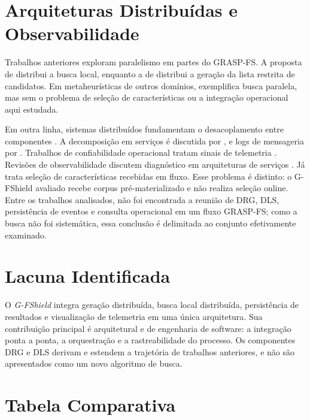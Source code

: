 \section{Arquiteturas Distribuídas e Observabilidade}

Trabalhos anteriores exploram paralelismo em partes do GRASP-FS. A proposta de  distribui a busca local, enquanto a de  distribui a geração da lista restrita de candidatos. Em metaheurísticas de outros domínios,  exemplifica busca paralela, mas sem o problema de seleção de características ou a integração operacional aqui estudada.

Em outra linha, sistemas distribuídos fundamentam o desacoplamento entre componentes \cite{Tanenbaum2007Distributed}. A decomposição em serviços é discutida por , e logs de mensageria por . Trabalhos de confiabilidade operacional tratam sinais de telemetria \cite{beyer2016site,mateus2021security}. Revisões de observabilidade discutem diagnóstico em arquiteturas de serviços \cite{usman2022observabilitysurvey,Faseeha2025MicroservicesObs}. Já  trata seleção de características recebidas em fluxo. Esse problema é distinto: o G-FShield avaliado recebe corpus pré-materializado e não realiza seleção online. Entre os trabalhos analisados, não foi encontrada a reunião de DRG, DLS, persistência de eventos e consulta operacional em um fluxo GRASP-FS; como a busca não foi sistemática, essa conclusão é delimitada ao conjunto efetivamente examinado.

\section{Lacuna Identificada}

O \textit{G-FShield} integra geração distribuída, busca local distribuída, persistência de resultados e visualização de telemetria em uma única arquitetura. Sua contribuição principal é arquitetural e de engenharia de software: a integração ponta a ponta, a orquestração e a rastreabilidade do processo. Os componentes DRG e DLS derivam e estendem a trajetória de trabalhos anteriores, e não são apresentados como um novo algoritmo de busca.

\section{Tabela Comparativa}

